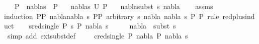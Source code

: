 \begin{isabellebody}
\ \ \ {\isachardoublequoteopen}P{}\ {\isasymTurnstile}\ {\isacharparenleft}{\kern0pt}nabla{\isacharcomma}{\kern0pt}s{\isacharparenright}{\kern0pt}\ {\isasymRightarrow}\ P{}{\isachardoublequoteclose}\isanewline
\ \ \ {\isachardoublequoteopen}{\isacharparenleft}{\kern0pt}nabla{}{\isacharcomma}{\kern0pt}s{}{\isacharparenright}{\kern0pt}{\isasymin}\ U\ P{}{\isachardoublequoteclose}\isanewline
\ \ \ {\isachardoublequoteopen}nabla{}{\isasymTurnstile}{\isacharparenleft}{\kern0pt}subst\ s{}{\isacharparenright}{\kern0pt}\ nabla{\isachardoublequoteclose}\isanewline
%
\isadelimproof
\ \ %
\endisadelimproof
%
\isatagproof
{}\isamarkupfalse%
\ assms\isanewline
{}\isamarkupfalse%
{\isacharparenleft}{\kern0pt}induction\ P{}{\isasymequiv}{\isachardoublequoteopen}P{}{\isachardoublequoteclose}\ nabla{\isasymequiv}{\isachardoublequoteopen}{\isacharparenleft}{\kern0pt}nabla{\isacharcomma}{\kern0pt}\ s{\isacharparenright}{\kern0pt}{\isachardoublequoteclose}\ P{}{\isasymequiv}{\isachardoublequoteopen}P{}{\isachardoublequoteclose}\ arbitrary{\isacharcolon}{\kern0pt}\ s\ nabla{}\ nabla\ s{}\ P{}\ P{}\ rule{\isacharcolon}{\kern0pt}\ red{\isacharunderscore}{\kern0pt}plus{\isachardot}{\kern0pt}induct{\isacharparenright}{\kern0pt}\isanewline
\ \ \isamarkupfalse%
\ {\isacharparenleft}{\kern0pt}sred{\isacharunderscore}{\kern0pt}single\ P{}\ s\ P{}\ nabla{}\ s{}{\isacharparenright}{\kern0pt}\isanewline
\ \ \isamarkupfalse%
\ \isamarkupfalse%
\ {\isachardoublequoteopen}nabla{}\ {\isasymTurnstile}\ {\isacharparenleft}{\kern0pt}subst\ s{}{\isacharparenright}{\kern0pt}\ {\isacharbraceleft}{\kern0pt}{\isacharbraceright}{\kern0pt}{\isachardoublequoteclose}\ \isamarkupfalse%
\ {\isacharparenleft}{\kern0pt}simp\ add{\isacharcolon}{\kern0pt}\ ext{\isacharunderscore}{\kern0pt}subst{\isacharunderscore}{\kern0pt}def{\isacharparenright}{\kern0pt}\ \isanewline
{}\isamarkupfalse%
\isanewline
\ \ \isamarkupfalse%
\ {\isacharparenleft}{\kern0pt}cred{\isacharunderscore}{\kern0pt}single\ P{}\ nabla{}\ P{}\ nabla{}\ s{}{\isacharparenright}{\kern0pt}\isanewline
\ \ \isamarkupfalse%

\end{isabellebody}

